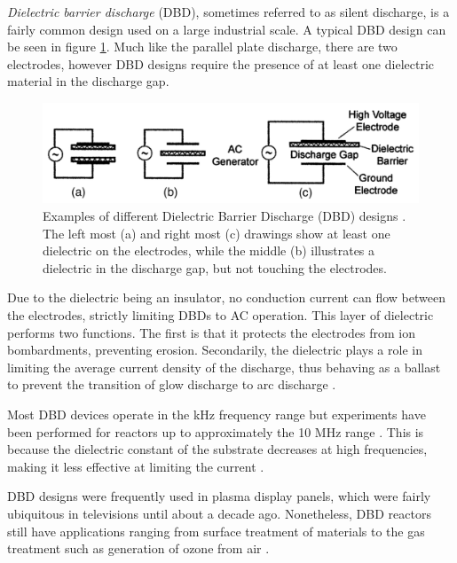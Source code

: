 \textit{Dielectric barrier discharge} (DBD), sometimes referred to as silent discharge, is a fairly common design used on a large industrial scale. A typical DBD design can be seen in figure \ref{fig:dbd_configuartions}. Much like the parallel plate discharge, there are two electrodes, however DBD designs require the presence of at least one dielectric material in the discharge gap. 

\begin{figure}[h!]
	\centering
	\includegraphics[width=\linewidth]{chapter_2/figures/dbd_configurations.png}
	\caption{Examples of different Dielectric Barrier Discharge (DBD) designs \cite{Kogelschatz2003}. The left most (a) and right most (c) drawings show at least one dielectric on the electrodes, while the middle (b) illustrates a dielectric in the discharge gap, but not touching the electrodes.}
	\label{fig:dbd_configuartions}
\end{figure} 

Due to the dielectric being an insulator, no conduction current can flow between the electrodes, strictly limiting DBDs to AC operation. This layer of dielectric performs two functions. The first is that it protects the electrodes from ion bombardments, preventing erosion. Secondarily, the dielectric plays a role in limiting the average current density of the discharge, thus behaving as a ballast to prevent the transition of glow discharge to arc discharge \cite{Kogelschatz2003}.  

Most DBD devices operate in the kHz frequency range but experiments have been performed for reactors up to approximately the 10 MHz range \cite{Tingay2014}. This is because the dielectric constant of the substrate decreases at high frequencies, making it less effective at limiting the current \cite{Kogelschatz2003}.  

DBD designs were frequently used in plasma display panels, which were fairly ubiquitous in televisions until about a decade ago. Nonetheless, DBD reactors still have applications ranging from surface treatment of materials to the gas treatment such as generation of ozone from air \cite{Brandenburg2017}.

